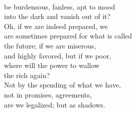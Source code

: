 \documentclass[smalldemyvopaper,11pt,twoside,onecolumn,openright,extrafontsizes]{memoir}
\begin{document}
\\be burdensous, fanless, apt to mood
\\into the dark and vanish out of it?
\\Oh, if we are indeed prepared, we
\\are sometimes prepared for what is called
\\the future; if we are miserous,
\\and highly favored, but if we poor,
\\where will the power to wallow
\\the rich again?
\\Not by the spending of what we have,
\\not in promises, agreements,
\\are we legalized; but as shadows.
\end{document}
